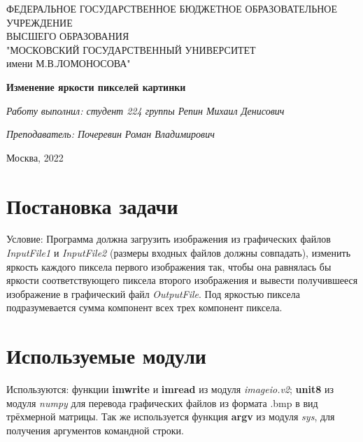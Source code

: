 \documentclass{article}
\begin{document}
\begin{titlepage}

\thispagestyle{empty}

\begin{center}
\large ФЕДЕРАЛЬНОЕ ГОСУДАРСТВЕННОЕ БЮДЖЕТНОЕ \linebreak
ОБРАЗОВАТЕЛЬНОЕ УЧРЕЖДЕНИЕ \\ ВЫСШЕГО ОБРАЗОВАНИЯ \\
"МОСКОВСКИЙ ГОСУДАРСТВЕННЫЙ УНИВЕРСИТЕТ \\ имени М.В.ЛОМОНОСОВА"
\end{center}

\vfill

\centerline{\Large{\textbf{Изменение яркости пикселей картинки}}}


\vfill
\vfill
\centerline{\textit{Работу выполнил: \hfill студент 224 группы Репин Михаил Денисович}}
\vspace{3mm}
\centerline{\textit{Преподаватель: \hfill Почеревин Роман Владимирович}}

\vfill

\centerline{Москва, 2022}
\clearpage
\end{titlepage} 

\tableofcontents{}
\newpage
\section{Постановка задачи}
\large{Условие: }Программа должна загрузить изображения из графических файлов {\it InputFile1} и  {\it InputFile2 }(размеры входных файлов должны совпадать), изменить яркость каждого пиксела первого изображения так, чтобы она равнялась бы яркости соответствующего пиксела второго изображения и вывести получившееся изображение в графический файл {\it OutputFile}.
Под яркостью пиксела подразумевается сумма компонент всех трех компонент пиксела.
\section{Используемые модули}
Используются: функции  {\bf imwrite} и {\bf imread} из модуля \large{\it imageio.v2}; {\bf unit8}  из модуля \large{\it numpy} для перевода графических файлов из формата .bmp в вид трёхмерной матрицы.
Так же используется функция {\bf argv} из модуля \large{\it  sys}, для получения аргументов командной строки.
\end{document}
